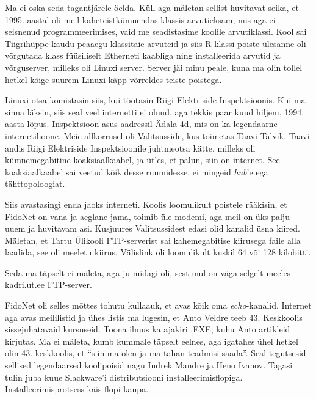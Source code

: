 Ma ei oska seda tagantjärele öelda. Küll aga mäletan sellist huvitavat seika, et 1995. aastal oli meil kaheteistkümnendas klassis
arvutieksam, mis aga ei seisnenud 
programmeerimises, vaid me seadistasime koolile
arvutiklassi. Kool sai Tiigrihüppe kaudu peaaegu 
klassitäie arvuteid ja siis R-klassi poiste ülesanne 
oli võrgutada klass 
füüsiliselt Etherneti kaabliga ning installeerida arvutid ja 
võrguserver, milleks oli Linuxi server. Server jäi minu peale, 
kuna ma olin tollel hetkel kõige suurem Linuxi käpp võrreldes 
teiste poistega.


Linuxi otsa komistasin siis, kui töötasin Riigi Elektriside 
Inspektsioonis. Kui ma sinna 
läksin, siis seal veel internetti ei olnud, aga tekkis paar kuud hiljem, 1994. aasta lõpus. 
Inspektsioon asus aadressil Ädala 4d, mis on ka 
legendaarne internetihoone. Meie allkorrusel oli 
Valitsusside, kus toimetas Taavi Talvik. Taavi andis Riigi Elektriside Inspektsioonile juhtmeotsa kätte, 
milleks oli kümnemegabitine koaksiaalkaabel, ja ütles, et palun, siin on 
internet. See koaksiaalkaabel sai veetud kõikidesse ruumidesse, ei mingeid 
\emph{hub}'e ega tähttopoloogiat.

Siis avastasingi enda jaoks interneti. Koolis loomulikult poistele rääkisin, et 
FidoNet on vana ja aeglane jama, toimib üle modemi, aga meil on 
üks palju uuem ja huvitavam asi. Kusjuures Valitsussidest edasi olid kanalid 
üsna kiired. Mäletan, et Tartu Ülikooli FTP-serverist sai kahemegabitise 
kiirusega faile alla laadida, see oli meeletu kiirus. Välislink oli 
loomulikult kuskil 64 või 128 kilobitti. 


Seda ma täpselt ei mäleta, aga ju midagi oli, sest mul on väga selgelt 
meeles kadri.ut.ee FTP-server. 

FidoNet oli selles mõttes tohutu kullaauk, et avas kõik oma 
\emph{echo}-kanalid. Internet aga avas meililistid ja ühes listis ma 
lugesin, et Anto Veldre teeb 43. 
Keskkoolis 
sissejuhatavaid kursuseid. Toona ilmus ka ajakiri .EXE, 
kuhu Anto artikleid kirjutas. Ma ei mäleta, kumb kummale täpselt eelnes, aga 
igatahes ühel hetkel olin 43. keskkoolis, et 
\enquote{siin ma olen ja ma tahan teadmisi saada}. Seal tegutsesid  
sellised legendaarsed koolipoisid nagu Indrek Mandre ja Heno Ivanov. Tagasi tulin  
juba kuue Slackware'i distributsiooni installeerimisflopiga. Installeerimisprotsess käis flopi kaupa. 

